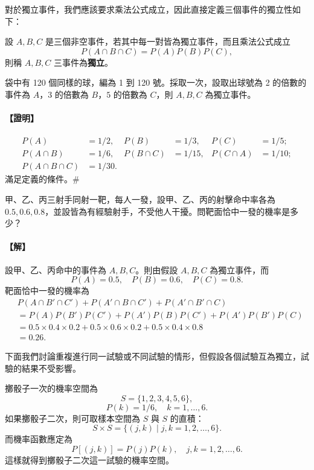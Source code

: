 對於獨立事件，我們應該要求乘法公式成立，因此直接定義三個事件的獨立性如下：

\medskip
\begin{definition*}
設 $A, B, C$ 是三個非空事件，若其中每一對皆為獨立事件，而且乘法公式成立
\[
P(A \cap B \cap C) = P(A)P(B)P(C),
\]
則稱 $A, B, C$ 三事件為\textbf{獨立}。
\end{definition*}

\medskip
\begin{example}\label{ex:b5s-4-14}
袋中有 120 個同樣的球，編為 1 到 120 號。採取一次，設取出球號為 2 的倍數的事件為 $A$，$3$ 的倍數為 $B$，$5$ 的倍數為 $C$，則 $A, B, C$ 為獨立事件。
\end{example}
\paragraph{【證明】}
\begin{align*}
P(A) &= 1/2, & P(B) &= 1/3, & P(C) &= 1/5; \\
P(A \cap B) &= 1/6, & P(B \cap C) &= 1/15, & P(C \cap A) &= 1/10; \\
P(A \cap B \cap C) &= 1/30.
\end{align*}
滿足定義的條件。\hfill\#

\medskip
\begin{example}\label{ex:b5s-4-15}
甲、乙、丙三射手同射一靶，每人一發，設甲、乙、丙的射擊命中率各為 $0.5, 0.6, 0.8$，並設皆為有經驗射手，不受他人干擾。問靶面恰中一發的機率是多少？
\end{example}
\paragraph{【解】}
設甲、乙、丙命中的事件為 $A, B, C$。則由假設 $A, B, C$ 為獨立事件，而
\[
P(A) = 0.5, \quad P(B) = 0.6, \quad P(C) = 0.8.
\]
靶面恰中一發的機率為
\begin{align*}
& P(A \cap B' \cap C') + P(A' \cap B \cap C') + P(A' \cap B' \cap C) \\
&= P(A)P(B')P(C') + P(A')P(B)P(C') + P(A')P(B')P(C) \\
&= 0.5 \times 0.4 \times 0.2 + 0.5 \times 0.6 \times 0.2 + 0.5 \times 0.4 \times 0.8 \\
&= 0.26. \tag*{\#}
\end{align*}

下面我們討論重複進行同一試驗或不同試驗的情形，但假設各個試驗互為獨立，試驗的結果不受影響。

擲骰子一次的機率空間為
\[
S = \{1, 2, 3, 4, 5, 6\},
\]
\[
P(k) = 1/6, \quad k = 1, \dots, 6.
\]
如果擲骰子二次，則可取樣本空間為 $S$ 與 $S$ 的直積：
\[
S \times S = \{(j, k) \mid j, k = 1, 2, \dots, 6\}.
\]
而機率函數應定為
\[
P[(j, k)] = P(j)P(k), \quad j, k = 1, 2, \dots, 6.
\]
這樣就得到擲骰子二次這一試驗的機率空間。

